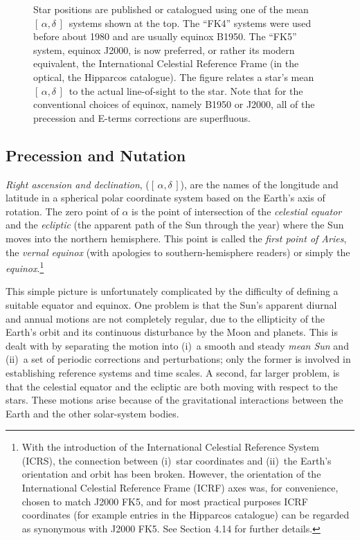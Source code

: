 \documentclass[11pt,twoside,nolof]{starlink}
\providecommand{\radec}     {$[\,\alpha,\delta\,]$}
\begin{document}
\begin{figure}
Star positions are published or catalogued using
one of the mean \radec\ systems shown at
the top.  The ``FK4'' systems
were used before about 1980 and are usually
equinox B1950.  The ``FK5'' system, equinox J2000, is now preferred,
or rather its modern equivalent, the International Celestial Reference
Frame (in the optical, the Hipparcos catalogue).
The figure relates a star's mean \radec\ to the actual
line-of-sight to the star.
Note that for the conventional choices of equinox, namely
B1950 or J2000, all of the precession and E-terms corrections
are superfluous.
\end{figure}

\subsection{Precession and Nutation}
\textit{Right ascension and declination}, (\radec), are the names
of the longitude and latitude in a spherical
polar coordinate system based on the Earth's axis of rotation.
The zero point of $\alpha$ is the point of intersection of
the \textit{celestial
equator}\/ and the \textit{ecliptic}\/ (the apparent path of the Sun
through the year) where the Sun moves into the northern
hemisphere.  This point is called the
\textit{first point of Aries},
the \textit{vernal equinox}\/ (with apologies to
southern-hemisphere readers) or simply the \textit{equinox}.\footnote{With
the introduction of the International Celestial Reference System (ICRS), the
connection between (i)~star coordinates and (ii)~the Earth's orientation
and orbit has been broken.  However, the orientation of the
International Celestial Reference Frame (ICRF) axes was, for convenience,
chosen to match J2000 FK5, and for most practical purposes ICRF coordinates
(for example entries in the Hipparcos catalogue) can be regarded as
synonymous with J2000 FK5.  See Section 4.14 for further details.}

This simple picture is unfortunately
complicated by the difficulty of defining
a suitable equator and equinox.  One problem is that the
Sun's apparent diurnal and annual
motions are not completely regular, due to the
ellipticity of the Earth's orbit and its continuous disturbance
by the Moon and planets.  This is dealt with by
separating the motion into (i)~a smooth and steady \textit{mean Sun}\/
and (ii)~a set of periodic corrections and perturbations; only the former
is involved in establishing reference systems and time scales.
A second, far larger problem, is that
the celestial equator and the ecliptic
are both moving with respect to the stars.
These motions arise because of the gravitational
interactions between the Earth and the other solar-system bodies.
\end{document}
